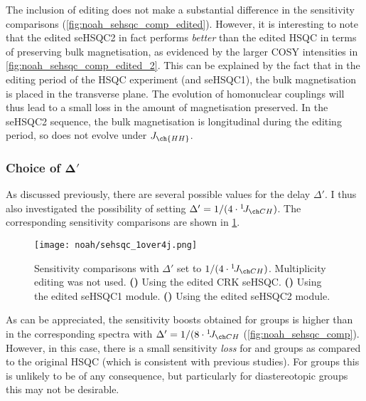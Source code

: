 The inclusion of editing does not make a substantial difference in the sensitivity comparisons (\cref{fig:noah_sehsqc_comp_edited}).
However, it is interesting to note that the edited seHSQC2 in fact performs \textit{better} than the edited HSQC in terms of preserving bulk magnetisation, as evidenced by the larger COSY intensities in \cref{fig:noah_sehsqc_comp_edited_2}.
This can be explained by the fact that in the editing period of the HSQC experiment (and seHSQC1), the bulk magnetisation is placed in the transverse plane.
The evolution of homonuclear couplings will thus lead to a small loss in the amount of  magnetisation preserved.
In the seHSQC2 sequence, the bulk magnetisation is longitudinal during the editing period, so does not evolve under $J_{\ch{HH}}$.


\subsubsection{Choice of $\symbf{\Delta'}$}

As discussed previously, there are several possible values for the delay $\Delta'$.
I thus also investigated the possibility of setting $\Delta' = 1 / (4 \cdot \oneJ{CH})$.
The corresponding sensitivity comparisons are shown in \cref{fig:noah_sehsqc_1over4j}.

\begin{figure}[!ht]
    \centering
    \texttt{[image: noah/sehsqc\_1over4j.png]}%
    {\label{fig:noah_sehsqc_1over4j_crk}}%
    {\label{fig:noah_sehsqc_1over4j_1}}%
    {\label{fig:noah_sehsqc_1over4j_2}}%
    \caption[Sensitivity comparisons for seHSQC with $\Delta' = 1 / (4 \cdot \oneJ{CH})$]{
        Sensitivity comparisons with $\Delta'$ set to $1 / (4 \cdot \oneJ{CH})$.
        Multiplicity editing was not used.
        \textbf{()} Using the edited CRK seHSQC.
        \textbf{()} Using the edited seHSQC1 module.
        \textbf{()} Using the edited seHSQC2 module.
    }
    \label{fig:noah_sehsqc_1over4j}
\end{figure}

As can be appreciated, the sensitivity boosts obtained for  groups is higher than in the corresponding spectra with $\Delta' = 1 / (8 \cdot \oneJ{CH}$ (\cref{fig:noah_sehsqc_comp}).
However, in this case, there is a small sensitivity \textit{loss} for  and  groups as compared to the original HSQC (which is consistent with previous studies\autocite{Schleucher1994JBNMR}).
For  groups this is unlikely to be of any consequence, but particularly for diastereotopic  groups this may not be desirable.

